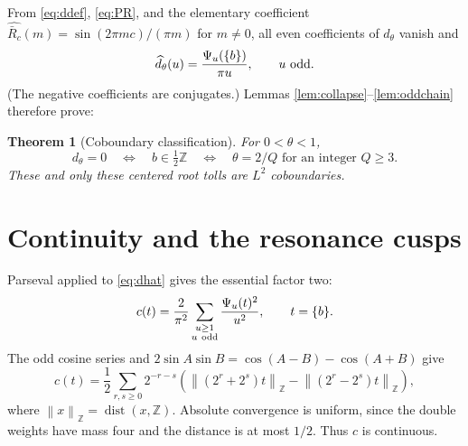 \documentclass[11pt]{article}
\numberwithin{equation}{section}
\newtheorem{theorem}{Theorem}[section]
\theoremstyle{definition}\newtheorem{definition}[theorem]{Definition}
\theoremstyle{remark}\newtheorem{remark}[theorem]{Remark}
\newcommand{\1}{\mathbf 1}\newcommand{\cD}{\mathcal D}
\newcommand{\norm}[1]{\left\lVert#1\right\rVert}
\newcommand{\dist}{\operatorname {dist}}
\begin{document}
From \eqref{eq:ddef}, \eqref{eq:PR}, and the elementary coefficient
$\widehat{\bar R_c}(m)=\sin(2\pi mc)/(\pi m)$ for $m\ne0$, all even
coefficients of $d_\theta$ vanish and
\begin{equation}
 \widehat d_\theta(u)={\Psi_u(\{b\})\over\pi u},\qquad u\text{ odd}.
                                                                  \label{eq:dhat}
\end{equation}
(The negative coefficients are conjugates.)  Lemmas
\ref{lem:collapse}--\ref{lem:oddchain} therefore prove:
\begin{theorem}[Coboundary classification]\label{thm:zero}
For $0<\theta<1$,
\begin{equation}d_\theta=0\quad\Longleftrightarrow\quad
 b\in\tfrac12\mathbb Z\quad\Longleftrightarrow\quad
 \theta=2/Q\text{ for an integer }Q\ge3.                       \label{eq:zeros}
\end{equation}
These and only these centered root tolls are $L^2$ coboundaries.
\end{theorem}

\clearpage
\section{Continuity and the resonance cusps}\label{sec:cusp}
Parseval applied to \eqref{eq:dhat} gives the essential factor two:
\begin{equation}
 c(t)={2\over\pi^2}\sum_{\substack{u\ge1\\u\ \mathrm{odd}}}
 {\Psi_u(t)^2\over u^2},\qquad t=\{b\}.                       \label{eq:cFourier}
\end{equation}
The odd cosine series and $2\sin A\sin B=\cos(A-B)-\cos(A+B)$ give
\begin{equation}
 c(t)=\frac12\sum_{r,s\ge0}2^{-r-s}
 \left(\norm{(2^r+2^s)t}_{\mathbb Z}-
       \norm{(2^r-2^s)t}_{\mathbb Z}\right),                 \label{eq:kernel}
\end{equation}
where $\norm{x}_{\mathbb Z}=\dist(x,\mathbb Z)$.  Absolute convergence is
uniform, since the double weights have mass four and the distance is at most
$1/2$.  Thus $c$ is continuous.
\end{document}
